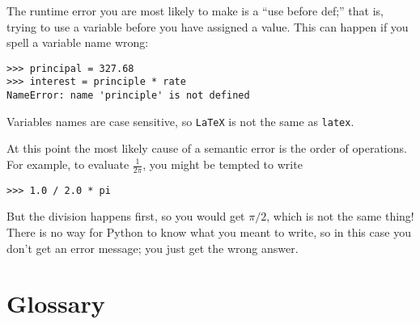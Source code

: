 
The runtime error you are most likely to make is a ``use before
def;'' that is, trying to use a variable before you have assigned
a value.  This can happen if you spell a variable name wrong:

\beforeverb
\begin{verbatim}
>>> principal = 327.68
>>> interest = principle * rate
NameError: name 'principle' is not defined
\end{verbatim}
\afterverb
%
Variables names are case sensitive, so {\tt LaTeX} is not the
same as {\tt latex}.


At this point the most likely cause of a semantic error is
the order of operations.  For example, to evaluate $\frac{1}{2 \pi}$,
you might be tempted to write

\beforeverb
\begin{verbatim}
>>> 1.0 / 2.0 * pi
\end{verbatim}
\afterverb
%
But the division happens first, so you would get $\pi / 2$, which
is not the same thing!  There is no way for Python
to know what you meant to write, so in this case you don't
get an error message; you just get the wrong answer.



\section{Glossary}

